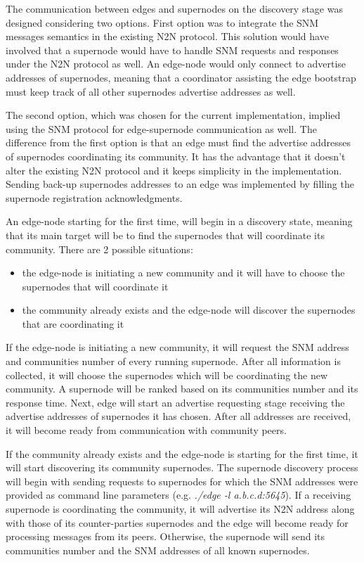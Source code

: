 
The communication between edges and supernodes on the discovery stage was designed considering two options. First option was to integrate the SNM messages semantics in the existing N2N protocol. This solution would have involved that a supernode would have to handle SNM requests and responses under the N2N protocol as well. An edge-node would only connect to advertise addresses of supernodes, meaning that a coordinator assisting the edge bootstrap must keep track of all other supernodes advertise addresses as well.

The second option, which was chosen for the current implementation, implied using the SNM protocol for edge-supernode communication as well. The difference from the first option is that an edge must find the advertise addresses of supernodes coordinating its community. It has the advantage that it doesn't alter the existing N2N protocol and it keeps simplicity in the implementation. Sending back-up supernodes addresses to an edge was implemented by filling the supernode registration acknowledgments.

An edge-node starting for the first time, will begin in a discovery state, meaning that its main target will be to find the supernodes that will coordinate its community. There are 2 possible situations:
\begin{itemize}
\item the edge-node is initiating a new community and it will have to choose the supernodes that will coordinate it
\item the community already exists and the edge-node will discover the supernodes that are coordinating it
\end{itemize}
If the edge-node is initiating a new community, it will request the SNM address and communities number of every running supernode. After all information is collected, it will choose the supernodes which will be coordinating the new community. A supernode will be ranked based on  its communities number and its response time. Next, edge will start an advertise requesting stage receiving the advertise addresses of supernodes it has chosen. After all addresses are received, it will become ready from communication with community peers.

If the community already exists and the edge-node is starting for the first time, it will start discovering its community supernodes. The supernode discovery process will begin with sending requests to supernodes for which the SNM addresses were provided as command line parameters  (e.g. \emph{./edge -l  a.b.c.d:5645}). If a receiving supernode is coordinating the community, it will advertise its N2N address along with those of its counter-parties supernodes and the edge will become ready for processing messages from its peers. Otherwise, the supernode will send its communities number and the SNM addresses of all known supernodes.

